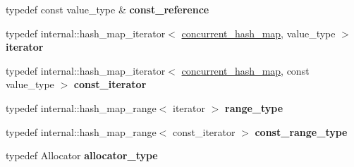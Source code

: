 \begin{DoxyCompactItemize}
\item 
\hypertarget{classtbb_1_1interface5_1_1concurrent__hash__map_a94bd468fd1e316ab5f2fcdaab13256d2}{}typedef const value\+\_\+type \& {\bfseries const\+\_\+reference}\label{classtbb_1_1interface5_1_1concurrent__hash__map_a94bd468fd1e316ab5f2fcdaab13256d2}

\item 
\hypertarget{classtbb_1_1interface5_1_1concurrent__hash__map_ad8e8d0320a40522466145894268e93d2}{}typedef internal\+::hash\+\_\+map\+\_\+iterator$<$ \hyperlink{classtbb_1_1interface5_1_1concurrent__hash__map}{concurrent\+\_\+hash\+\_\+map}, value\+\_\+type $>$ {\bfseries iterator}\label{classtbb_1_1interface5_1_1concurrent__hash__map_ad8e8d0320a40522466145894268e93d2}

\item 
\hypertarget{classtbb_1_1interface5_1_1concurrent__hash__map_a4d719f4927647da558d240275fd6a5ec}{}typedef internal\+::hash\+\_\+map\+\_\+iterator$<$ \hyperlink{classtbb_1_1interface5_1_1concurrent__hash__map}{concurrent\+\_\+hash\+\_\+map}, const value\+\_\+type $>$ {\bfseries const\+\_\+iterator}\label{classtbb_1_1interface5_1_1concurrent__hash__map_a4d719f4927647da558d240275fd6a5ec}

\item 
\hypertarget{classtbb_1_1interface5_1_1concurrent__hash__map_a4f2c8bb239d5eeb705a6f36b5f950d8a}{}typedef internal\+::hash\+\_\+map\+\_\+range$<$ iterator $>$ {\bfseries range\+\_\+type}\label{classtbb_1_1interface5_1_1concurrent__hash__map_a4f2c8bb239d5eeb705a6f36b5f950d8a}

\item 
\hypertarget{classtbb_1_1interface5_1_1concurrent__hash__map_a01da04aebcff08bf75374fc9ae160d05}{}typedef internal\+::hash\+\_\+map\+\_\+range$<$ const\+\_\+iterator $>$ {\bfseries const\+\_\+range\+\_\+type}\label{classtbb_1_1interface5_1_1concurrent__hash__map_a01da04aebcff08bf75374fc9ae160d05}

\item 
\hypertarget{classtbb_1_1interface5_1_1concurrent__hash__map_aa888b9a21f08eca699102aac328a546b}{}typedef Allocator {\bfseries allocator\+\_\+type}\label{classtbb_1_1interface5_1_1concurrent__hash__map_aa888b9a21f08eca699102aac328a546b}

\end{DoxyCompactItemize}
